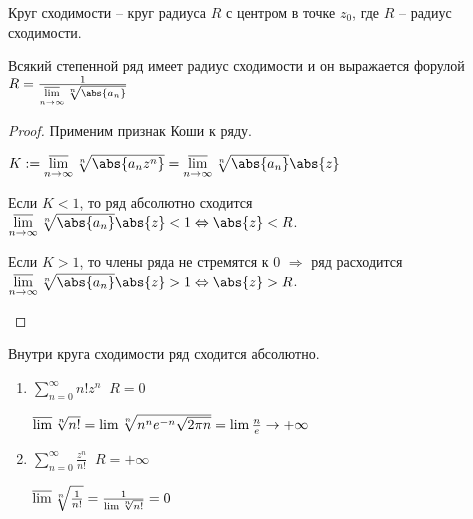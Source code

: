 \begin{definition}\slashns
    
    Круг сходимости -- круг радиуса $R$ с центром в точке $z_0$, где $R$ -- радиус сходимости.
\end{definition}

\begin{theorem}\slashns
    
    Всякий степенной ряд имеет радиус сходимости и он выражается форулой $R = \frac{1}{\varlimsup\limits_{n \to \infty} \sqrt[n]{\abs{a_n}} }$
\end{theorem}

\begin{proof}\slashns
    
    Применим признак Коши к ряду.
    
    $K := \varlimsup\limits_{n \to \infty} \sqrt[n]{\abs{a_nz^n}} = \varlimsup\limits_{n \to \infty} \sqrt[n]{\abs{a_n}} \abs{z}$
    \begin{description} 
        \item 
        Если $K < 1$, то ряд абсолютно сходится $\varlimsup\limits_{n \to \infty} \sqrt[n]{\abs{a_n}} \abs{z} < 1 \Leftrightarrow \abs{z} < R$.
    
        \item 
        Если $K > 1$, то члены ряда не стремятся к 0 $\Rightarrow$ ряд расходится $\varlimsup\limits_{n \to \infty} \sqrt[n]{\abs{a_n}} \abs{z} > 1 \Leftrightarrow \abs{z} > R$.
    \end{description}
\end{proof}

\begin{remark}\slashns
    
    Внутри круга сходимости ряд сходится абсолютно. 
\end{remark}

\begin{example}\slashns
    
    \begin{enumerate}
        \item $\sum\limits_{n = 0}^{\infty} n!z^n \;\; R = 0$
        
        $\varlimsup \sqrt[n]{n!} = \lim \sqrt[n]{n^n e^{-n} \sqrt{2\pi n}} = \lim \frac{n}{e} \to +\infty$
        
        \item $\sum\limits_{n = 0}^{\infty} \frac{z^n}{n!} \;\; R = +\infty$
        
        $\varlimsup \sqrt[n]{\frac{1}{n!}} = \frac{1}{\lim \sqrt[n]{n!}} = 0$
        
    \end{enumerate}
\end{example}

